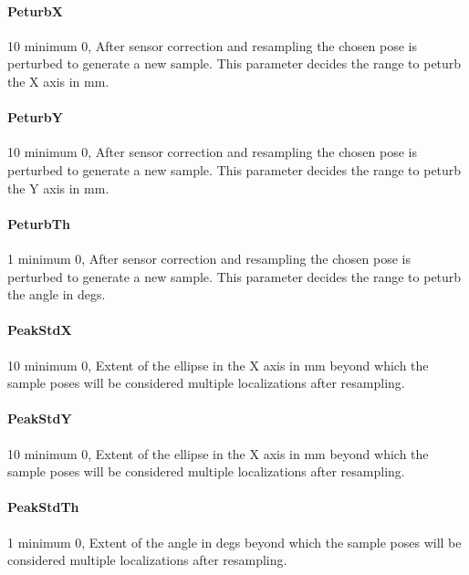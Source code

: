 \documentclass{article}
\begin{document}
\paragraph{PeturbX} 10                minimum 0,  After sensor correction and resampling
                          the chosen pose is perturbed to generate a new
                          sample. This parameter decides the range to peturb
                          the X axis in mm.

\paragraph{PeturbY} 10                minimum 0,  After sensor correction and resampling
                          the chosen pose is perturbed to generate a new
                          sample. This parameter decides the range to peturb
                          the Y axis in mm.

\paragraph{PeturbTh} 1                minimum 0,  After sensor correction and resampling
                          the chosen pose is perturbed to generate a new
                          sample. This parameter decides the range to peturb
                          the angle in degs.

\paragraph{PeakStdX} 10               minimum 0,  Extent of the ellipse in the X axis in
                          mm beyond which the sample poses will be considered
                          multiple localizations after resampling.

\paragraph{PeakStdY} 10               minimum 0,  Extent of the ellipse in the X axis in
                          mm beyond which the sample poses will be considered
                          multiple localizations after resampling.

\paragraph{PeakStdTh} 1               minimum 0,  Extent of the angle in degs beyond which
                          the sample poses will be considered multiple
                          localizations after resampling.
\end{document}
